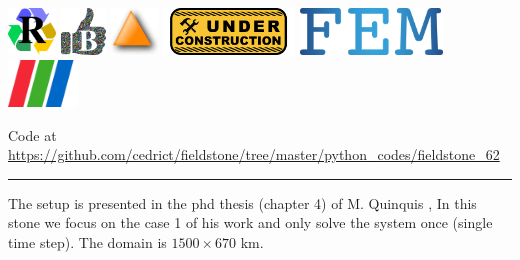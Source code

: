 \includegraphics[height=1.25cm]{images/pictograms/replication}
\includegraphics[height=1.25cm]{images/pictograms/benchmark}
\includegraphics[height=1.25cm]{images/pictograms/triangle}
\includegraphics[height=1.25cm]{images/pictograms/under_construction}
\includegraphics[height=1.25cm]{images/pictograms/FEM}
\includegraphics[height=1.25cm]{images/pictograms/paraview}





\begin{center}
Code at \url{https://github.com/cedrict/fieldstone/tree/master/python_codes/fieldstone_62}
\end{center}

\par\noindent\rule{\textwidth}{0.4pt}

The setup is presented in the phd thesis (chapter 4) of M. Quinquis \cite{quin14},
In this stone we focus on the case 1 of his work and only solve the system once (single time step).
The domain is $1500\times 670$ km. 

